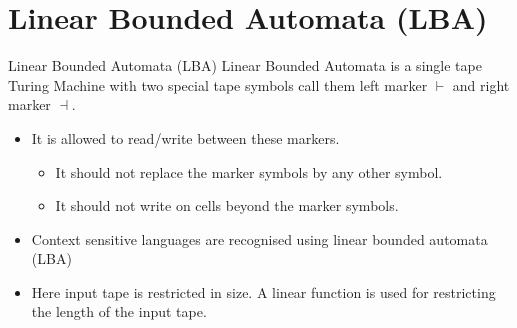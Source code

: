 \documentclass{beamer}
\begin{document}
\section{Linear Bounded Automata (LBA)}
\begin{frame}{Linear Bounded Automata (LBA)}
Linear Bounded Automata is a single tape Turing Machine with
two special tape symbols call them left marker $\vdash$ and right marker
$\dashv$.
\begin{itemize}
	\item  It is allowed to read/write between these markers.
	\begin{itemize}
		\item It should not replace the marker symbols by any other symbol.
		\item It should not write on cells beyond the marker symbols.
	\end{itemize}
\end{itemize}
\begin{itemize}
	\item Context sensitive languages are recognised using linear bounded automata (LBA)
	\item Here input tape is restricted in size. A linear function is used for restricting the length of the input tape.
\end{itemize}
\end{frame}
\end{document}
